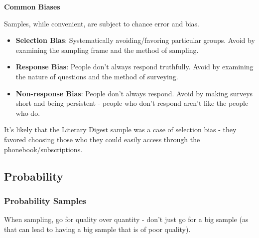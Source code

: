 \textbf{Common Biases}

Samples, while convenient, are subject to chance error and bias.
\begin{itemize}
\item \textbf{Selection Bias}: Systematically avoiding/favoring particular groups. Avoid by examining the sampling frame and the method of sampling.
\item \textbf{Response Bias}: People don't always respond truthfully. Avoid by examining the nature of questions and the method of surveying.
\item \textbf{Non-response Bias}: People don't always respond. Avoid by making surveys short and being persistent - people who don't respond aren't like the people who do.
\end{itemize}
It's likely that the Literary Digest sample was a case of selection bias - they favored choosing those who they could easily access through the phonebook/subscriptions.

\subsection{Probability}
\subsubsection{Probability Samples}
When sampling, go for quality over quantity - don't just go for a big sample (as that can lead to having a big sample that is of poor quality).

